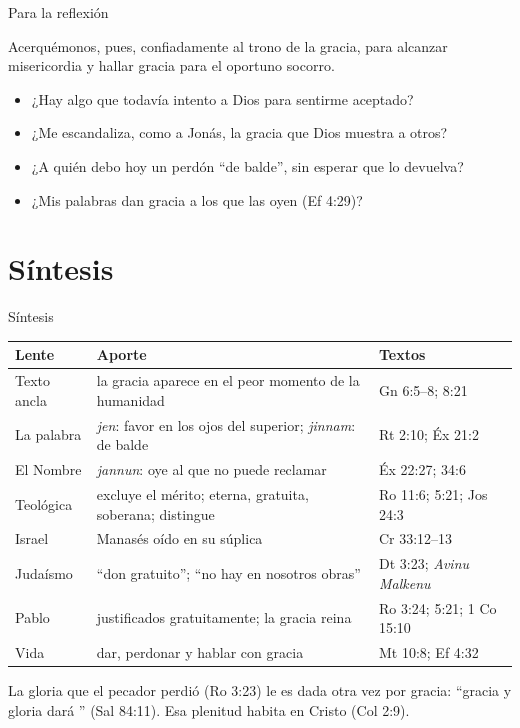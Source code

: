 \begin{frame}{Para la reflexión}
\begin{cita}Acerquémonos, pues, confiadamente al trono de la gracia, para alcanzar misericordia y hallar gracia para el oportuno socorro.\end{cita}
\small
\begin{itemize}
\item ¿Hay algo que todavía intento  a Dios para sentirme aceptado?
\item ¿Me escandaliza, como a Jonás, la gracia que Dios muestra a otros?
\item ¿A quién debo hoy un perdón ``de balde'', sin esperar que lo devuelva?
\item ¿Mis palabras dan gracia a los que las oyen (Ef 4:29)?
\end{itemize}
\end{frame}

\section{Síntesis}

\begin{frame}{Síntesis}
\scriptsize\renewcommand{\arraystretch}{1.1}
\begin{tabular}{@{}>{\RaggedRight\arraybackslash}p{1.8cm}>{\RaggedRight\arraybackslash}p{6.6cm}>{\RaggedRight\arraybackslash}p{3.2cm}@{}}
\toprule
\textbf{Lente} & \textbf{Aporte} & \textbf{Textos} \\ \midrule
Texto ancla & la gracia aparece en el peor momento de la humanidad & Gn 6:5--8; 8:21 \\
La palabra & \emph{jen}: favor en los ojos del superior; \emph{jinnam}: de balde & Rt 2:10; Éx 21:2 \\
El Nombre & \emph{jannun}: oye al que no puede reclamar & Éx 22:27; 34:6 \\
Teológica & excluye el mérito; eterna, gratuita, soberana; distingue & Ro 11:6; 5:21; Jos 24:3 \\
Israel & Manasés oído en su súplica & 2 Cr 33:12--13 \\
Judaísmo & ``don gratuito''; ``no hay en nosotros obras'' & Dt 3:23; \emph{Avinu Malkenu} \\
Pablo & justificados gratuitamente; la gracia reina & Ro 3:24; 5:21; 1 Co 15:10 \\
Vida & dar, perdonar y hablar con gracia & Mt 10:8; Ef 4:32 \\
\bottomrule
\end{tabular}\par\medskip
\begin{tcolorbox}[colback=papiro,colframe=dorado,boxrule=1pt,arc=3pt,fontupper=\small\itshape]
La gloria que el pecador perdió (Ro 3:23) le es dada otra vez por gracia: ``gracia y gloria dará \SENOR'' (Sal 84:11). Esa plenitud habita en Cristo (Col 2:9).
\end{tcolorbox}
\end{frame}

